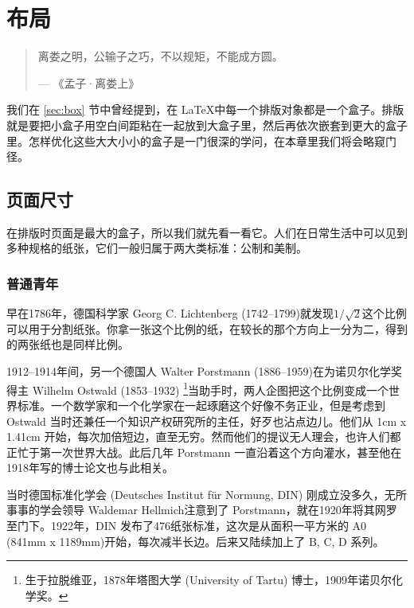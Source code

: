 \chapter{布局}

\begin{quotation}
离娄之明，公输子之巧，不以规矩，不能成方圆。
\begin{flushright}
--- 《孟子·离娄上》
\end{flushright}
\end{quotation}

我们在 \ref{sec:box} 节中曾经提到，在 \LaTeX 中每一个排版对象都是一个盒子。排版就是要把小盒子用空白间距粘在一起放到大盒子里，然后再依次嵌套到更大的盒子里。怎样优化这些大大小小的盒子是一门很深的学问，在本章里我们将会略窥门径。

\section{页面尺寸}

在排版时页面是最大的盒子，所以我们就先看一看它。人们在日常生活中可以见到多种规格的纸张，它们一般归属于两大类标准：公制和美制。

\subsection{普通青年}

早在1786年，德国科学家 Georg C. Lichtenberg (1742--1799)\indexLichtenberg 就发现$1/\sqrt{2}$这个比例可以用于分割纸张。你拿一张这个比例的纸，在较长的那个方向上一分为二，得到的两张纸也是同样比例。

1912--1914年间，另一个德国人 Walter Porstmann (1886--1959)\indexPorstmann 在为诺贝尔化学奖得主 Wilhelm Ostwald (1853--1932)\indexOstwald{} \footnote{生于拉脱维亚，1878年塔图大学 (University of Tartu) 博士，1909年诺贝尔化学奖。}当助手时，两人企图把这个比例变成一个世界标准。一个数学家和一个化学家在一起琢磨这个好像不务正业，但是考虑到 Ostwald 当时还兼任一个知识产权研究所的主任，好歹也沾点边儿。他们从 1cm x 1.41cm 开始，每次加倍短边，直至无穷。然而他们的提议无人理会，也许人们都正忙于第一次世界大战。此后几年 Porstmann 一直沿着这个方向灌水，甚至他在1918年写的博士论文也与此相关。

当时德国标准化学会 (Deutsches Institut für Normung, DIN) 刚成立没多久，无所事事的学会领导 Waldemar Hellmich\indexHellmich 注意到了 Porstmann，就在1920年将其网罗至门下。1922年，DIN 发布了476纸张标准，这次是从面积一平方米的 A0 (841mm x 1189mm)开始，每次减半长边。后来又陆续加上了 B, C, D 系列。

